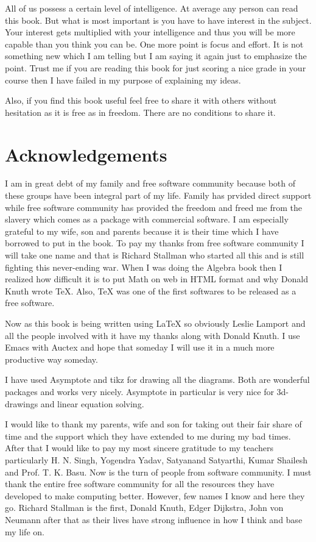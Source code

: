 All of us possess a certain level of intelligence. At average any person can read this book. But what is most important is you have
to have interest in the subject. Your interest gets multiplied with your intelligence and thus you will be more capable than you
think you can be. One more point is focus and effort. It is not something new which I am telling but I am saying it again just to
emphasize the point. Trust me if you are reading this book for just scoring a nice grade in your course then I have failed in my
purpose of explaining my ideas.

Also, if you find this book useful feel free to share it with others without hesitation as it is free as in freedom. There are no
conditions to share it.

\section*{Acknowledgements}
I am in great debt of my family and free software community because both of
these groups have been integral part of my life. Family has prvided direct
support while free software community has provided the freedom and freed me
from the slavery which comes as a package with commercial software. I am
especially grateful to my wife, son and parents because it is their time which
I have borrowed to put in the book. To pay my thanks from free software
community  I will take one name and that is Richard Stallman who started all
this  and is still fighting this never-ending war. When I was doing the Algebra
book then I realized how difficult it is to put Math on web in HTML format and
why Donald Knuth wrote \TeX{}. Also, \TeX{} was one of the first softwares to
be released as a free software.

Now as this book is being written using \LaTeX{} so obviously Leslie Lamport
and all the people involved with it have my thanks along with Donald Knuth. I
use Emacs with Auctex and hope that someday I will use it in a much more
productive way someday.

I have used Asymptote and tikz for drawing all the diagrams. Both are wonderful
packages and works very nicely. Asymptote in particular is very nice for 3d-drawings and linear equation solving.

I would like to thank my parents, wife and son for taking out their fair share
of time and the support which they have extended to me during my bad
times. After that I would like to pay my most sincere gratitude to my teachers
particularly H. N. Singh, Yogendra Yadav, Satyanand Satyarthi, Kumar Shailesh
and Prof. T. K. Basu. Now is the turn of people from software community. I must
thank the entire free software community for all the resources they have
developed to make computing better. However, few names I know and here they
go. Richard Stallman is the first, Donald Knuth, Edger Dijkstra, John von Neumann after that as their lives have strong influence in
how I think and base my life on.

